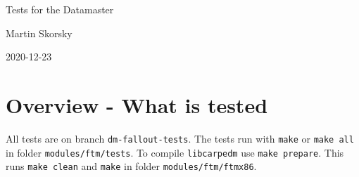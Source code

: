 \documentclass[12pt,a4paper]{report}
\begin{document}
\begin{titlepage}
\vspace{2cm}
\begin{center}
\Huge{Tests for the Datamaster}

\Large{Martin Skorsky}

\Large{2020-12-23}
\end{center}
\vfill
\end{titlepage}

\tableofcontents

\chapter{Overview - What is tested}
All tests are on branch \texttt{dm-fallout-tests}. The tests run with \texttt{make} or \texttt{make all} in folder \texttt{modules/ftm/tests}.
To compile \texttt{libcarpedm} use \texttt{make prepare}. This runs \texttt{make clean} and \texttt{make} in folder \texttt{modules/ftm/ftmx86}.
\end{document}
